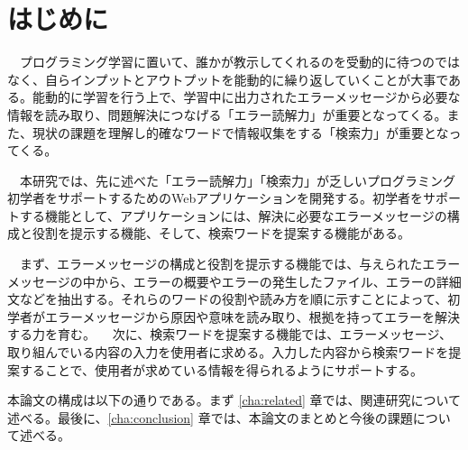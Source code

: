 \documentclass[main]{subfiles}
\begin{document}
\chapter{はじめに}
\label{cha:intro}

　プログラミング学習に置いて、誰かが教示してくれるのを受動的に待つのではなく、自らインプットとアウトプットを能動的に繰り返していくことが大事である。能動的に学習を行う上で、学習中に出力されたエラーメッセージから必要な情報を読み取り、問題解決につなげる「エラー読解力」が重要となってくる。また、現状の課題を理解し的確なワードで情報収集をする「検索力」が重要となってくる。

　本研究では、先に述べた「エラー読解力」「検索力」が乏しいプログラミング初学者をサポートするためのWebアプリケーションを開発する。初学者をサポートする機能として、アプリケーションには、解決に必要なエラーメッセージの構成と役割を提示する機能、そして、検索ワードを提案する機能がある。

　まず、エラーメッセージの構成と役割を提示する機能では、与えられたエラーメッセージの中から、エラーの概要やエラーの発生したファイル、エラーの詳細文などを抽出する。それらのワードの役割や読み方を順に示すことによって、初学者がエラーメッセージから原因や意味を読み取り、根拠を持ってエラーを解決する力を育む。
　次に、検索ワードを提案する機能では、エラーメッセージ、取り組んでいる内容の入力を使用者に求める。入力した内容から検索ワードを提案することで、使用者が求めている情報を得られるようにサポートする。


本論文の構成は以下の通りである。まず \ref{cha:related} 章では、関連研究について述べる。最後に、\ref{cha:conclusion} 章では、本論文のまとめと今後の課題について述べる。
\end{document}
